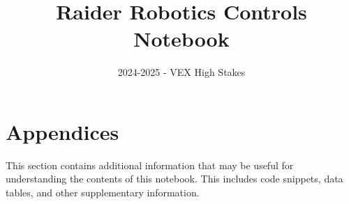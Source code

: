 \documentclass{engineeringNotebook}
\title{Raider Robotics Controls Notebook}
\subtitle{2024-2025 - VEX High Stakes}
\begin{document}
\maketitle
\graphicspath{{images/}{../images/}}
\newpage
\tableofcontents
\newpage


\newpage

\newpage


\newpage


\section{Appendices}
This section contains additional information that may be useful for understanding the contents of this notebook. This includes code snippets, data tables, and other supplementary information.
\newpage
\end{document}
